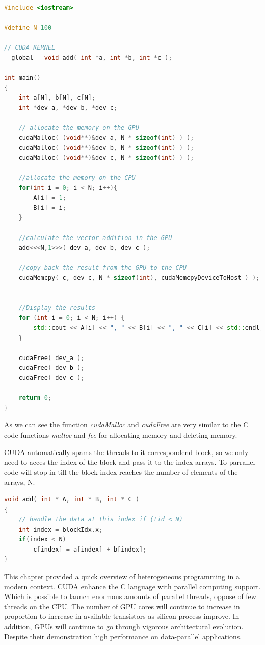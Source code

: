 \begin{lstlisting}[language=C++, caption={GPU Vector Addition}]
#include <iostream>

#define N 100

// CUDA KERNEL
__global__ void add( int *a, int *b, int *c );

int main()
{
    int a[N], b[N], c[N];
    int *dev_a, *dev_b, *dev_c;

    // allocate the memory on the GPU
    cudaMalloc( (void**)&dev_a, N * sizeof(int) ) );
    cudaMalloc( (void**)&dev_b, N * sizeof(int) ) );
    cudaMalloc( (void**)&dev_c, N * sizeof(int) ) );
    
    //allocate the memory on the CPU
    for(int i = 0; i < N; i++){
        A[i] = 1;
        B[i] = i;
    }
    
    //calculate the vector addition in the GPU
    add<<<N,1>>>( dev_a, dev_b, dev_c );
    
    //copy back the result from the GPU to the CPU 
    cudaMemcpy( c, dev_c, N * sizeof(int), cudaMemcpyDeviceToHost ) );
     
     
    //Display the results
    for (int i = 0; i < N; i++) {
        std::cout << A[i] << ", " << B[i] << ", " << C[i] << std::endl;
    }
    
    cudaFree( dev_a );
    cudaFree( dev_b );
    cudaFree( dev_c );
    
    return 0;
}
\end{lstlisting}

As we can see the function \textit{cudaMalloc} and \textit{cudaFree} are very similar to the C code functions \textit{malloc} and \textit{fee} for allocating memory and deleting memory.

CUDA automatically spams the threads to it correspondend block, so we only need to acces the index of the block and pass it to the index arrays. To parrallel code will stop in-till the block index reaches the number of elements of the arrays, N.

\begin{lstlisting}[language=C++, caption={GPU Vector Addition}]
void add( int * A, int * B, int * C )
{
    // handle the data at this index if (tid < N)
    int index = blockIdx.x; 
    if(index < N)
        c[index] = a[index] + b[index];
}
\end{lstlisting}

\bigskip


This chapter provided a quick overview of heterogeneous programming in a modern context. CUDA  enhance the C language with parallel computing support. Which is possible to launch  enormous amounts of parallel threads, oppose of few threads on the CPU. The number of GPU cores will continue to increase in proportion to increase in available transistors as silicon process improve. In addition, GPUs will continue to go through vigorous architectural evolution. Despite their demonstration high performance on data-parallel applications. \cite{hwu}








